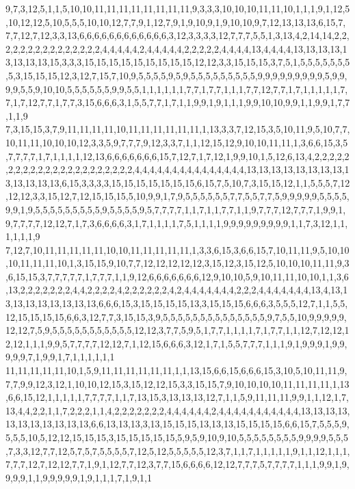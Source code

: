 9,7,3,12,5,1,1,5,10,10,11,11,11,11,11,11,11,11,9,3,3,3,10,10,10,11,11,10,1,1,1,9,1,12,5,10,12,12,5,10,5,5,5,10,10,12,7,7,9,1,12,7,9,1,9,10,9,1,9,10,10,9,7,12,13,13,13,6,15,7,7,7,12,7,12,3,3,13,6,6,6,6,6,6,6,6,6,6,6,6,3,12,3,3,3,3,12,7,7,7,5,5,1,3,13,4,2,14,14,2,2,2,2,2,2,2,2,2,2,2,2,2,2,2,4,4,4,4,4,2,4,4,4,4,4,2,2,2,2,2,4,4,4,4,13,4,4,4,4,13,13,13,13,13,13,13,13,15,3,3,3,15,15,15,15,15,15,15,15,15,12,12,3,3,15,15,15,3,7,5,1,5,5,5,5,5,5,5,5,3,15,15,15,12,3,12,7,15,7,10,9,5,5,5,5,9,5,9,5,5,5,5,5,5,5,5,5,9,9,9,9,9,9,9,9,9,5,9,9,9,9,5,5,9,10,10,5,5,5,5,5,5,9,9,5,5,1,1,1,1,1,1,7,7,1,7,7,1,1,1,7,7,12,7,7,1,7,1,1,1,1,1,7,7,1,7,12,7,7,1,7,7,3,15,6,6,6,3,1,5,5,7,7,1,7,1,1,9,9,1,9,1,1,1,9,9,10,10,9,9,1,1,9,9,1,7,7,1,1,9
7,3,15,15,3,7,9,11,11,11,11,10,11,11,11,11,11,11,1,13,3,3,7,12,15,3,5,10,11,9,5,10,7,7,10,11,11,10,10,10,12,3,3,5,9,7,7,7,9,12,3,3,7,1,1,12,15,12,9,10,10,11,11,1,3,6,6,15,3,5,7,7,7,7,1,7,1,1,1,1,12,13,6,6,6,6,6,6,6,15,7,12,7,1,7,12,1,9,9,10,1,5,12,6,13,4,2,2,2,2,2,2,2,2,2,2,2,2,2,2,2,2,2,2,2,2,2,2,4,4,4,4,4,4,4,4,4,4,4,4,4,4,4,13,13,13,13,13,13,13,13,13,13,13,13,13,6,15,3,3,3,3,15,15,15,15,15,15,15,6,15,7,5,10,7,3,15,15,12,1,1,5,5,5,7,12,12,12,3,3,15,12,7,12,15,15,15,5,10,9,9,1,7,9,5,5,5,5,5,5,7,7,5,5,7,7,5,9,9,9,9,9,5,5,5,5,9,9,1,9,5,5,5,5,5,5,5,5,5,9,5,5,5,5,9,5,7,7,7,7,1,1,7,1,1,7,7,1,1,9,7,7,7,12,7,7,7,1,9,9,1,9,7,7,7,7,12,12,7,1,7,3,6,6,6,6,3,1,7,1,1,1,1,7,5,1,1,1,1,9,9,9,9,9,9,9,9,9,1,1,7,3,12,1,1,1,1,1,1,9
7,12,7,10,11,11,11,11,11,10,10,11,11,11,11,11,1,3,3,6,15,3,6,6,15,7,10,11,11,9,5,10,10,10,11,11,11,10,1,3,15,15,9,10,7,7,12,12,12,12,12,3,15,12,3,15,12,5,10,10,10,11,11,9,3,6,15,15,3,7,7,7,7,7,1,7,7,7,1,1,9,12,6,6,6,6,6,6,6,12,9,10,10,5,9,10,11,11,10,10,1,1,3,6,13,2,2,2,2,2,2,2,4,4,2,2,2,2,4,2,2,2,2,2,2,4,2,4,4,4,4,4,4,4,2,2,2,4,4,4,4,4,4,4,13,4,13,13,13,13,13,13,13,13,13,6,6,6,15,3,15,15,15,15,13,3,15,15,15,6,6,6,3,5,5,5,12,7,1,1,5,5,12,15,15,15,15,6,6,3,12,7,7,3,15,15,3,9,5,5,5,5,5,5,5,5,5,5,5,5,5,5,9,7,5,5,10,9,9,9,9,9,12,12,7,5,9,5,5,5,5,5,5,5,5,5,5,5,12,12,3,7,7,5,9,5,1,7,7,1,1,1,1,7,1,7,7,1,1,12,7,12,12,12,12,1,1,1,9,9,5,7,7,7,7,12,12,7,1,12,15,6,6,6,3,12,1,7,1,5,5,7,7,7,1,1,1,9,1,9,9,9,1,9,9,9,9,9,7,1,9,9,1,7,1,1,1,1,1,1
11,11,11,11,11,10,1,5,9,11,11,11,11,11,11,1,1,13,15,6,6,15,6,6,6,15,3,10,5,10,11,11,9,7,7,9,9,12,3,12,1,10,10,12,15,3,15,12,12,15,3,3,15,15,7,9,10,10,10,10,11,11,11,11,1,13,6,6,15,12,1,1,1,1,1,7,7,7,7,1,1,7,13,15,3,13,13,13,12,7,1,1,5,9,11,11,11,9,9,1,1,12,1,7,13,4,4,2,2,1,1,7,2,2,2,1,1,4,2,2,2,2,2,2,2,4,4,4,4,4,4,2,4,4,4,4,4,4,4,4,4,4,4,13,13,13,13,13,13,13,13,13,13,13,6,6,13,13,13,3,13,15,15,15,13,13,13,15,15,15,15,6,6,15,7,5,5,5,9,5,5,5,10,5,12,12,15,15,15,3,15,15,15,15,15,5,9,5,9,10,9,10,5,5,5,5,5,5,5,5,9,9,9,9,5,5,5,7,3,3,12,7,7,12,5,7,5,7,5,5,5,5,7,12,5,12,5,5,5,5,5,12,3,7,1,1,7,1,1,1,1,1,9,1,1,12,1,1,1,7,7,7,12,7,12,12,7,7,1,9,1,12,7,7,12,3,7,7,15,6,6,6,6,12,12,7,7,7,5,7,7,7,7,1,1,1,9,9,1,9,9,9,9,1,1,9,9,9,9,9,1,9,1,1,1,7,1,9,1,1
